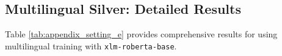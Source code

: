 \subsection{Multilingual Silver: Detailed Results}
\label{appendix:setting_e}

Table \ref{tab:appendix_setting_e} provides comprehensive results for \Smulti using multilingual training with \verb|xlm-roberta-base|.

\begin{table}[h]
    \centering
    \small
    \resizebox{1\textwidth}{!}{
    
    }
    \caption{Detailed results for \Smulti (multilingual training). Shows performance at $\rmix=1$ (\distilmodels only), $\rmix=0$ (\weakModel only), and optimal ratio $\rmix_{max}$ (\hybridmodel).}
    \label{tab:appendix_setting_e}
\end{table}

\clearpage


